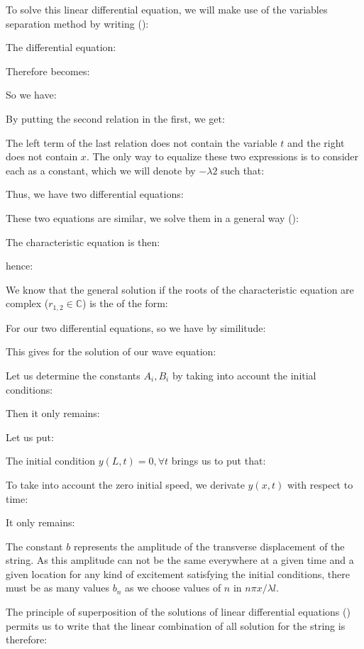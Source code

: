 	To solve this linear differential equation, we will make use of the variables separation method by writing ():
	
	The differential equation:
	
	Therefore becomes:
	
	So we have:
	
	By putting the second relation in the first, we get:
	
	The left term of the last relation does not contain the variable $t$ and the right does not contain $x$. The only way to equalize these two expressions is to consider each as a constant, which we will denote by $-\lambda2$ such that:
	
	Thus, we have two differential equations:
	
	These two equations are similar, we solve them in a general way ():
	
	The characteristic equation is then:
	
	hence:
	
	We know that the general solution if the roots of the characteristic equation are complex ($r_{1,2}\in \mathbb{C}$) is the of the form:
	
	For our two differential equations, so we have by similitude:
		
	This gives for the solution of our wave equation:
	
	Let us determine the constants $A_i,B_i$ by taking into account the initial conditions:
	
	Then it only remains:
	
	Let us put:
	
	The initial condition $y(L,t)=0,\forall t$ brings us to put that:
	
	To take into account the zero initial speed, we derivate $y(x,t)$ with respect to time:
	
	It only remains:
	
	The constant $b$ represents the amplitude of the transverse displacement of the string. As this amplitude can not be the same everywhere at a given time and a given location for any kind of excitement satisfying the initial conditions, there must be as many values $b_n$ as we choose values of $n$ in $n\pi x/\lambda l$.
	
	The principle of superposition of the solutions of linear differential equations () permits us to write that the linear combination of all solution for the string is therefore:
	
